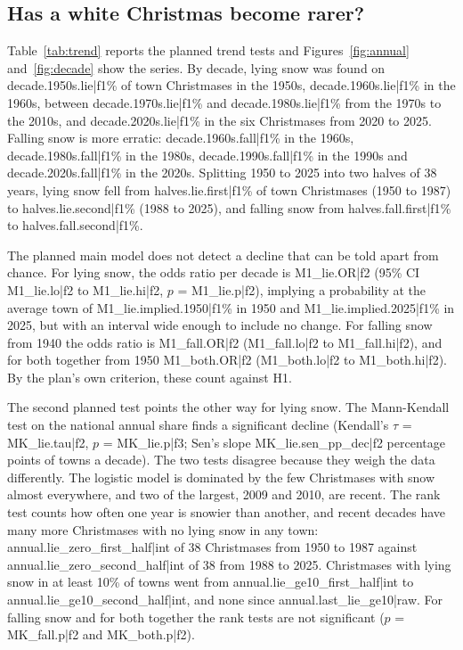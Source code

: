 \documentclass[11pt,a4paper]{article}
\begin{document}
\subsection{Has a white Christmas become rarer?}
Table~\ref{tab:trend} reports the planned trend tests and Figures~\ref{fig:annual} and~\ref{fig:decade} show the series. By decade, lying snow was found on {{decade.1950s.lie|f1}}\% of town Christmases in the 1950s, {{decade.1960s.lie|f1}}\% in the 1960s, between {{decade.1970s.lie|f1}}\% and {{decade.1980s.lie|f1}}\% from the 1970s to the 2010s, and {{decade.2020s.lie|f1}}\% in the six Christmases from 2020 to 2025. Falling snow is more erratic: {{decade.1960s.fall|f1}}\% in the 1960s, {{decade.1980s.fall|f1}}\% in the 1980s, {{decade.1990s.fall|f1}}\% in the 1990s and {{decade.2020s.fall|f1}}\% in the 2020s. Splitting 1950 to 2025 into two halves of 38 years, lying snow fell from {{halves.lie.first|f1}}\% of town Christmases (1950 to 1987) to {{halves.lie.second|f1}}\% (1988 to 2025), and falling snow from {{halves.fall.first|f1}}\% to {{halves.fall.second|f1}}\%.

The planned main model does not detect a decline that can be told apart from chance. For lying snow, the odds ratio per decade is {{M1_lie.OR|f2}} (95\% CI {{M1_lie.lo|f2}} to {{M1_lie.hi|f2}}, $p$ = {{M1_lie.p|f2}}), implying a probability at the average town of {{M1_lie.implied.1950|f1}}\% in 1950 and {{M1_lie.implied.2025|f1}}\% in 2025, but with an interval wide enough to include no change. For falling snow from 1940 the odds ratio is {{M1_fall.OR|f2}} ({{M1_fall.lo|f2}} to {{M1_fall.hi|f2}}), and for both together from 1950 {{M1_both.OR|f2}} ({{M1_both.lo|f2}} to {{M1_both.hi|f2}}). By the plan's own criterion, these count against H1.

The second planned test points the other way for lying snow. The Mann-Kendall test on the national annual share finds a significant decline (Kendall's $\tau$ = {{MK_lie.tau|f2}}, $p$ = {{MK_lie.p|f3}}; Sen's slope {{MK_lie.sen_pp_dec|f2}} percentage points of towns a decade). The two tests disagree because they weigh the data differently. The logistic model is dominated by the few Christmases with snow almost everywhere, and two of the largest, 2009 and 2010, are recent. The rank test counts how often one year is snowier than another, and recent decades have many more Christmases with no lying snow in any town: {{annual.lie_zero_first_half|int}} of 38 Christmases from 1950 to 1987 against {{annual.lie_zero_second_half|int}} of 38 from 1988 to 2025. Christmases with lying snow in at least 10\% of towns went from {{annual.lie_ge10_first_half|int}} to {{annual.lie_ge10_second_half|int}}, and none since {{annual.last_lie_ge10|raw}}. For falling snow and for both together the rank tests are not significant ($p$ = {{MK_fall.p|f2}} and {{MK_both.p|f2}}).
\end{document}
